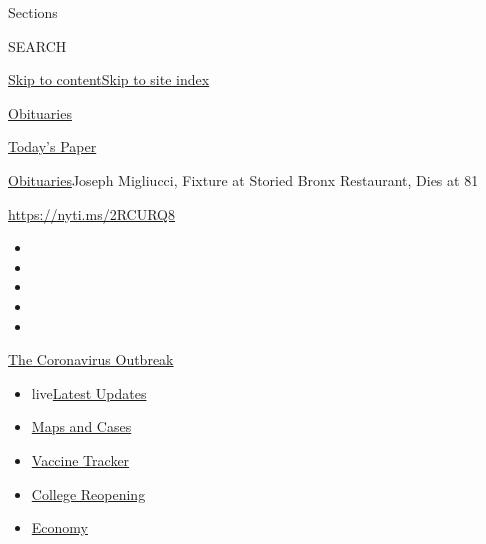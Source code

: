 Sections

SEARCH

\protect\hyperlink{site-content}{Skip to
content}\protect\hyperlink{site-index}{Skip to site index}

\href{https://www.nytimes.com/section/obituaries}{Obituaries}

\href{https://myaccount.nytimes.com/auth/login?response_type=cookie\&client_id=vi}{}

\href{https://www.nytimes.com/section/todayspaper}{Today's Paper}

\href{/section/obituaries}{Obituaries}\textbar{}Joseph Migliucci,
Fixture at Storied Bronx Restaurant, Dies at 81

\url{https://nyti.ms/2RCURQ8}

\begin{itemize}
\item
\item
\item
\item
\item
\end{itemize}

\href{https://www.nytimes.com/news-event/coronavirus?action=click\&pgtype=Article\&state=default\&region=TOP_BANNER\&context=storylines_menu}{The
Coronavirus Outbreak}

\begin{itemize}
\tightlist
\item
  live\href{https://www.nytimes.com/2020/08/03/world/coronavirus-covid-19.html?action=click\&pgtype=Article\&state=default\&region=TOP_BANNER\&context=storylines_menu}{Latest
  Updates}
\item
  \href{https://www.nytimes.com/interactive/2020/us/coronavirus-us-cases.html?action=click\&pgtype=Article\&state=default\&region=TOP_BANNER\&context=storylines_menu}{Maps
  and Cases}
\item
  \href{https://www.nytimes.com/interactive/2020/science/coronavirus-vaccine-tracker.html?action=click\&pgtype=Article\&state=default\&region=TOP_BANNER\&context=storylines_menu}{Vaccine
  Tracker}
\item
  \href{https://www.nytimes.com/2020/08/02/us/covid-college-reopening.html?action=click\&pgtype=Article\&state=default\&region=TOP_BANNER\&context=storylines_menu}{College
  Reopening}
\item
  \href{https://www.nytimes.com/live/2020/08/03/business/stock-market-today-coronavirus?action=click\&pgtype=Article\&state=default\&region=TOP_BANNER\&context=storylines_menu}{Economy}
\end{itemize}

